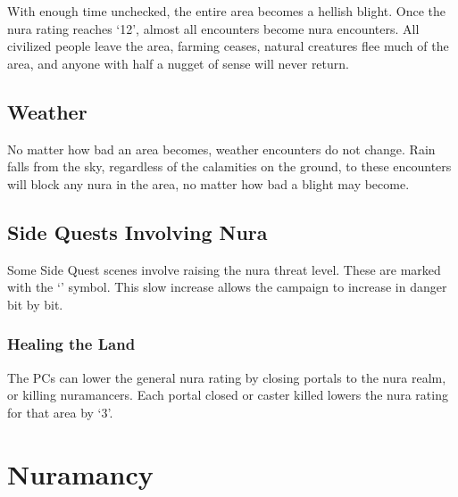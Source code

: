 \begin{multicols}{2}
With enough time unchecked, the entire area becomes a hellish \gls{blight}.
Once the nura rating reaches `12', almost all encounters become nura encounters.
All civilized people leave the area, farming ceases, natural creatures flee much of the area, and anyone with half a nugget of sense will never return.

\subsection{Weather}

No matter how bad an area becomes, weather encounters do not change.
Rain falls from the sky, regardless of the calamities on the ground, to these encounters will block any nura in the area, no matter how bad a \gls{blight} may become.

\subsection{Side Quests Involving Nura}
Some Side Quest scenes involve raising the nura threat level.
These are marked with the `\N' symbol.
This slow increase allows the campaign to increase in danger bit by bit.

\subsubsection{Healing the Land}

The PCs can lower the general nura rating by closing portals to the nura realm, or killing nuramancers.
Each portal closed or caster killed lowers the nura rating for that area by `3'.

\end{multicols}

\section{Nuramancy}

\label{saurecanta}

